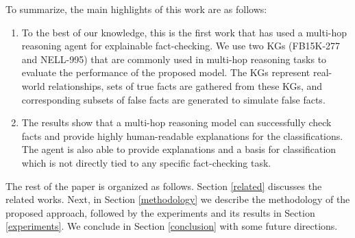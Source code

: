 To summarize, the main highlights of this work are as follows:
\begin{enumerate}
    \item To the best of our knowledge, this is the first work that has used a multi-hop reasoning agent for explainable fact-checking. We use two KGs (FB15K-277 and NELL-995) that are commonly used in multi-hop reasoning tasks to evaluate the performance of the proposed model. The KGs represent real-world relationships, sets of true facts are gathered from these KGs, and corresponding subsets of false facts are generated to simulate false facts.
    \item The results show that a multi-hop reasoning model can successfully check facts and provide highly human-readable explanations for the classifications. The agent is also able to provide explanations and a basis for classification which is not directly tied to any specific fact-checking task.
\end{enumerate}

The rest of the paper is organized as follows. Section \ref{related} discusses the related works. Next,  in Section \ref{methodology} we describe the methodology of the proposed approach, followed by the experiments and its results in Section \ref{experiments}. We conclude in Section \ref{conclusion} with some future directions. 
